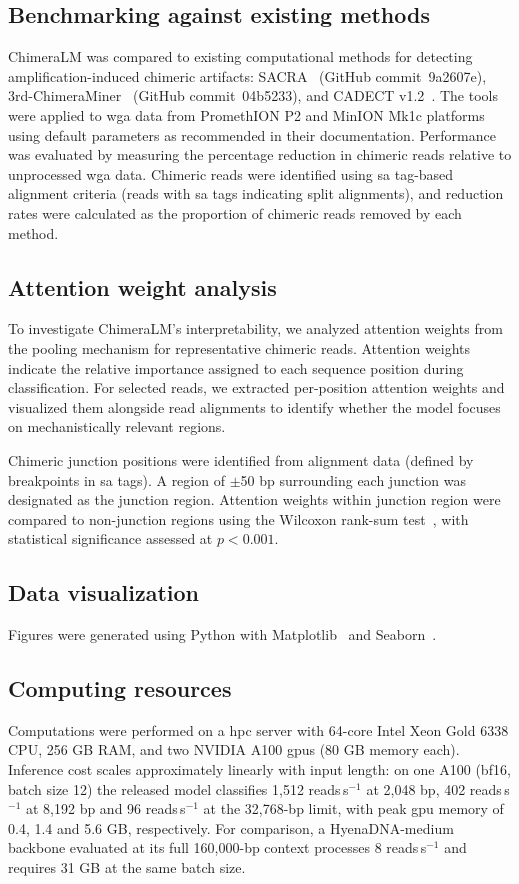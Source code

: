 \documentclass[pdflatex,lineno]{sn-jnl}%
\newif\ifrevisedtext
\newcommand{\chg}[1]{\ifrevisedtext\textcolor{revcolor}{#1}\else#1\fi}
\begin{document}
\subsection*{Benchmarking against existing methods}
ChimeraLM was compared to existing computational methods for detecting amplification-induced chimeric artifacts: SACRA~\cite{kiguchi2021longread} (GitHub commit~9a2607e),  3rd-ChimeraMiner~\cite{lu2023exploration} (GitHub commit~04b5233), and CADECT v1.2~\cite{agyabeng2025evaluating}.
The tools were applied to \gls{wga} data from PromethION P2 and MinION Mk1c platforms using default parameters as recommended in their documentation.
Performance was evaluated by measuring the percentage reduction in chimeric reads relative to unprocessed \gls{wga} data.
Chimeric reads were identified using \gls{sa} tag-based alignment criteria (reads with \gls{sa} tags indicating split alignments), and reduction rates were calculated as the proportion of chimeric reads removed by each method.

\subsection*{Attention weight analysis}
To investigate ChimeraLM's interpretability, we analyzed attention weights from the pooling mechanism for representative chimeric reads.
Attention weights indicate the relative importance assigned to each sequence position during classification.
For selected reads, we extracted per-position attention weights and visualized them alongside read alignments to identify whether the model focuses on mechanistically relevant regions.

Chimeric junction positions were identified from alignment data (defined by breakpoints in \gls{sa} tags).
A region of $\pm$50 bp surrounding each junction was designated as the junction region.
Attention weights within junction region were compared to non-junction regions using the Wilcoxon rank-sum test~\cite{2020SciPy-NMeth}, with statistical significance assessed at $p < 0.001$.

\subsection*{Data visualization}
Figures were generated using Python with Matplotlib~\cite{Hunter2007} and Seaborn~\cite{Waskom2021}.

\subsection*{Computing resources}
Computations were performed on a \gls{hpc} server with 64-core Intel Xeon Gold 6338 CPU, 256 GB RAM, and two NVIDIA A100 \glspl{gpu} (80 GB memory each).
\chg{Inference cost scales approximately linearly with input length: on one A100 (bf16, batch size 12) the released model classifies 1,512 reads\,s$^{-1}$ at 2,048 bp, 402 reads\,s$^{-1}$ at 8,192 bp and 96 reads\,s$^{-1}$ at the 32,768-bp limit, with peak \gls{gpu} memory of 0.4, 1.4 and 5.6 GB, respectively.
	For comparison, a HyenaDNA-medium backbone evaluated at its full 160,000-bp context processes 8 reads\,s$^{-1}$ and requires 31 GB at the same batch size.}
\end{document}
